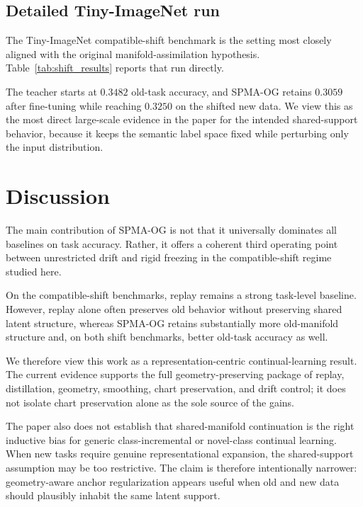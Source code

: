 \documentclass[11pt]{article}
\newcommand{\method}{\textsc{SPMA-OG}}
\begin{document}
\subsection{Detailed Tiny-ImageNet run}
The Tiny-ImageNet compatible-shift benchmark is the setting most closely aligned with the original manifold-assimilation hypothesis. Table~\ref{tab:shift_results} reports that run directly.

\begin{table}[t]
  \centering
  \caption{Tiny-ImageNet compatible-shift run. We report old-task accuracy both before and after fine-tuning to make the same-class setting explicit.}
  \label{tab:shift_results}
  \footnotesize
  \resizebox{\linewidth}{!}{}
\end{table}

The teacher starts at $0.3482$ old-task accuracy, and \method{} retains $0.3059$ after fine-tuning while reaching $0.3250$ on the shifted new data. We view this as the most direct large-scale evidence in the paper for the intended shared-support behavior, because it keeps the semantic label space fixed while perturbing only the input distribution.

\section{Discussion}
The main contribution of \method{} is not that it universally dominates all baselines on task accuracy. Rather, it offers a coherent third operating point between unrestricted drift and rigid freezing in the compatible-shift regime studied here.

On the compatible-shift benchmarks, replay remains a strong task-level baseline. However, replay alone often preserves old behavior without preserving shared latent structure, whereas \method{} retains substantially more old-manifold structure and, on both shift benchmarks, better old-task accuracy as well.

We therefore view this work as a representation-centric continual-learning result. The current evidence supports the full geometry-preserving package of replay, distillation, geometry, smoothing, chart preservation, and drift control; it does not isolate chart preservation alone as the sole source of the gains.

The paper also does not establish that shared-manifold continuation is the right inductive bias for generic class-incremental or novel-class continual learning. When new tasks require genuine representational expansion, the shared-support assumption may be too restrictive. The claim is therefore intentionally narrower: geometry-aware anchor regularization appears useful when old and new data should plausibly inhabit the same latent support.
\end{document}
